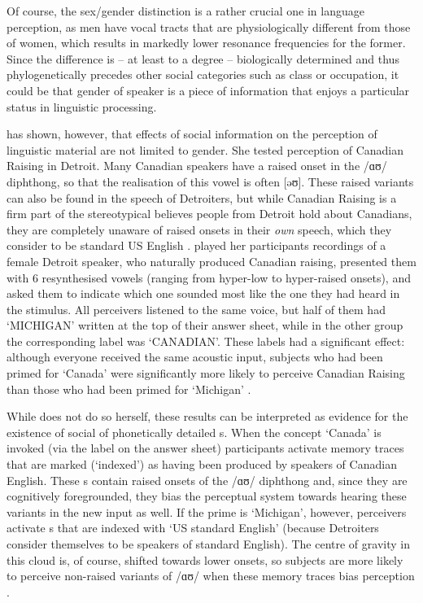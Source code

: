Of course, the sex/gender distinction is a rather crucial one in language perception, as men have vocal tracts that are physiologically different from those of women, which results in markedly lower resonance frequencies for the former.
Since the difference is -- at least to a degree -- biologically determined and thus phylogenetically precedes other social categories such as class or occupation, it could be that gender of speaker is a piece of information that enjoys a particular status in linguistic processing.

\textcite{niedzielski1999} has shown, however, that effects of social information on the perception of linguistic material are not limited to gender.
She tested perception of Canadian Raising in Detroit.
Many Canadian speakers have a raised onset in the /ɑʊ/ diphthong, so that the realisation of this vowel is often [əʊ].
These raised variants can also be found in the speech of Detroiters, but while Canadian Raising is a firm part of the stereotypical believes people from Detroit hold about Canadians, they are completely unaware of raised onsets in their \emph{own} speech, which they consider to be standard US English \parencite[cf.][63]{niedzielski1999}.
\citeauthor{niedzielski1999} played her participants recordings of a female Detroit speaker, who naturally produced Canadian raising, presented them with 6 resynthesised vowels (ranging from hyper-low to hyper-raised onsets), and asked them to indicate which one sounded most like the one they had heard in the stimulus.
All perceivers listened to the same voice, but half of them had `MICHIGAN' written at the top of their answer sheet, while in the other group the corresponding label was `CANADIAN'.
These labels had a significant effect: although everyone received the same acoustic input, subjects who had been primed for `Canada' were significantly more likely to perceive Canadian Raising than those who had been primed for `Michigan' \parencite[cf.][64--68]{niedzielski1999}.

While \citeauthor{niedzielski1999} does not do so herself, these results can be interpreted as evidence for the existence of social  of phonetically detailed s.
When the concept `Canada' is invoked (via the label on the answer sheet) participants activate memory traces that are marked (`indexed') as having been produced by speakers of Canadian English.
These s contain raised onsets of the /ɑʊ/ diphthong and, since they are cognitively foregrounded, they bias the perceptual system towards hearing these variants in the new input as well.
If the prime is `Michigan', however, perceivers activate s that are indexed with `US standard English' (because Detroiters consider themselves to be speakers of standard English).
The centre of gravity in this  cloud is, of course, shifted towards lower onsets, so subjects are more likely to perceive non-raised variants of /ɑʊ/ when these memory traces bias perception \parencite[cf.][372]{hayetal2006a}.

